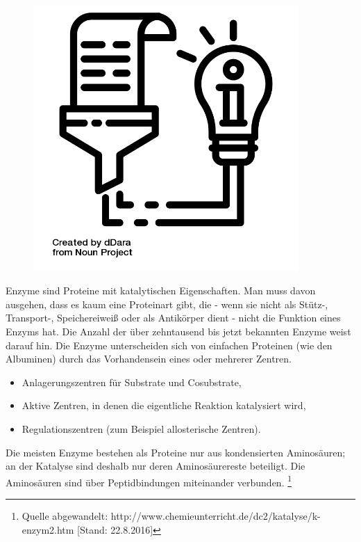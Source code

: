 \documentclass{scrartcl}  %
\begin{document}
\vspace{0.3cm}
			\begin{tcolorbox}[enhanced,
				colback=white,
				colframe=darkgray,
				fonttitle=\sffamily\bfseries\large, 
				title=Enzyme,  %
				attach boxed title to top left={xshift=3.2mm,yshift=-0.50mm},
				boxed title style={skin=enhancedfirst jigsaw,size=small,arc=1mm,bottom=-1mm,colframe=darkgray,height=0.75cm},
				colbacktitle=darkgray,
				drop lifted shadow]
				\begin{figure}  
					\centering
					\vspace{-14pt}  %
					\includegraphics[width=0.9\textwidth]{symbols/symbol_tex_content}
				\end{figure}
				
				Enzyme sind Proteine mit katalytischen Eigenschaften. Man muss davon ausgehen, dass es kaum eine Proteinart gibt, die - wenn sie nicht als Stütz-, Transport-, Speichereiweiß oder als Antikörper dient - nicht die Funktion eines Enzyms hat. Die Anzahl der über zehntausend bis jetzt bekannten Enzyme weist darauf hin. 
				Die Enzyme unterscheiden sich von einfachen Proteinen (wie den Albuminen) durch das Vorhandensein eines oder mehrerer Zentren.
				\begin{itemize}
					\item Anlagerungszentren für Substrate und Cosubstrate,
				    \item Aktive Zentren, in denen die eigentliche Reaktion katalysiert wird,
				    \item Regulationszentren (zum Beispiel allosterische Zentren).
				\end{itemize}
				Die meisten Enzyme bestehen als Proteine nur aus kondensierten Aminosäuren; an der Katalyse sind deshalb nur deren Aminosäurereste beteiligt. Die Aminosäuren sind über Peptidbindungen miteinander verbunden.
				\footnote{Quelle abgewandelt: http://www.chemieunterricht.de/dc2/katalyse/k-enzym2.htm [Stand: 22.8.2016]}
			\end{tcolorbox}
\end{document}
